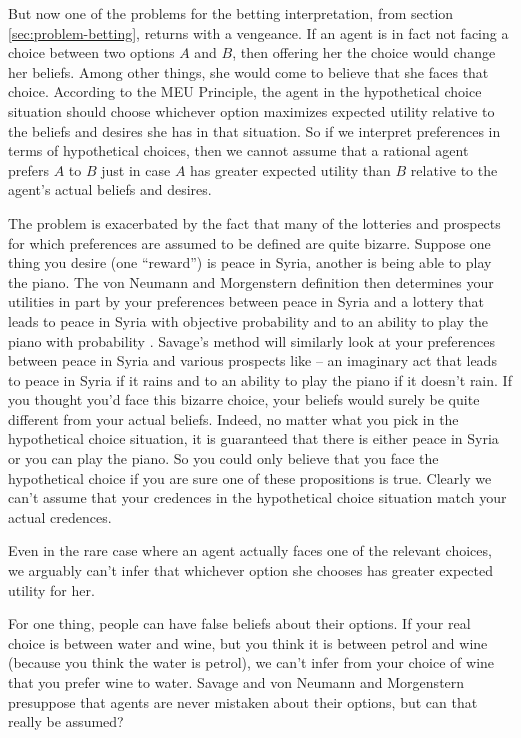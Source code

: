 But now one of the problems for the betting interpretation, from
section \ref{sec:problem-betting}, returns with a vengeance. If an
agent is in fact not facing a choice between two options $A$ and $B$,
then offering her the choice would change her beliefs. Among other
things, she would come to believe that she faces that
choice. According to the MEU Principle, the agent in the hypothetical
choice situation should choose whichever option maximizes expected
utility relative to the beliefs and desires she has in that
situation. So if we interpret preferences in terms of hypothetical
choices, then we cannot assume that a rational agent prefers $A$ to
$B$ just in case $A$ has greater expected utility than $B$ relative to
the agent's actual beliefs and desires.


The problem is exacerbated by the fact that many of the lotteries and
prospects for which preferences are assumed to be defined are quite
bizarre. Suppose one thing you desire (one ``reward'') is peace in
Syria, another is being able to play the piano. The von Neumann and
Morgenstern definition then determines your utilities in part by your
preferences between peace in Syria and a lottery that leads to peace
in Syria with objective probability  and to an ability
to play the piano with probability . Savage's method
will similarly look at your preferences between peace in Syria and
various prospects like 
-- an imaginary act that leads to peace in Syria if it rains and to an
ability to play the piano if it doesn't rain. If you thought you'd
face this bizarre choice, your beliefs would surely be quite different
from your actual beliefs. Indeed, no matter what you pick in the
hypothetical choice situation, it is guaranteed that there is either
peace in Syria or you can play the piano. So you could only believe
that you face the hypothetical choice if you are sure one of these
propositions is true. Clearly we can't assume that your credences in
the hypothetical choice situation match your actual credences.

Even in the rare case where an agent actually faces one of the
relevant choices, we arguably can't infer that whichever option she
chooses has greater expected utility for her. 

For one thing, people can have false beliefs about their options. If
your real choice is between water and wine, but you think it is
between petrol and wine (because you think the water is petrol), we
can't infer from your choice of wine that you prefer wine to
water. Savage and von Neumann and Morgenstern presuppose that agents
are never mistaken about their options, but can that really be
assumed?

